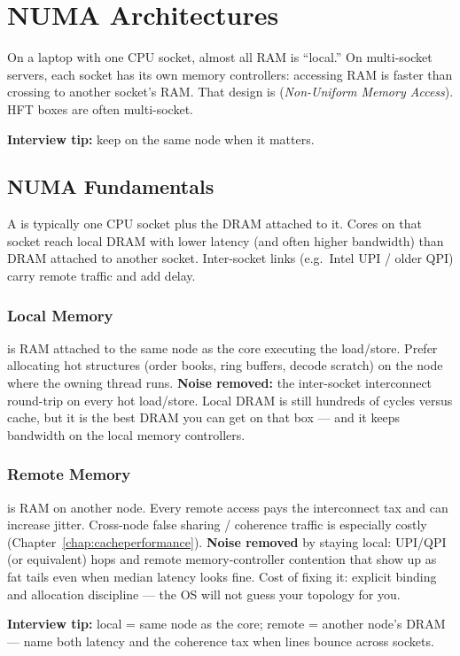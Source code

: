 \chapter{NUMA Architectures}
\label{chap:numa}

On a laptop with one CPU socket, almost all RAM is ``local.'' On multi-socket servers, 
each socket has its own memory controllers: accessing  RAM is faster than 
crossing to another socket's RAM. That design is  
(\emph{Non-Uniform Memory Access}). HFT boxes are often multi-socket.
\par\noindent\textbf{Interview tip:} keep  on the same node when it matters.

\section{NUMA Fundamentals}
\label{sec:numa-fundamentals}
A  is typically one CPU socket plus the DRAM attached to it. 
Cores on that socket reach local DRAM with lower latency (and often higher bandwidth) 
than DRAM attached to another socket. Inter-socket links (e.g.\ Intel UPI / older QPI) 
carry remote traffic and add delay.

\subsection{Local Memory}
\label{subsec:numa-local-memory}
 is RAM attached to the same node as the core executing the load/store. 
Prefer allocating hot structures (order books, ring buffers, decode scratch) on the node 
where the owning thread runs.
\newline
\textbf{Noise removed:} the inter-socket interconnect round-trip on every hot load/store. 
Local DRAM is still hundreds of cycles versus cache, but it is the best DRAM you can get 
on that box --- and it keeps bandwidth on the local memory controllers.

\subsection{Remote Memory}
\label{subsec:numa-remote-memory}
 is RAM on another node. Every remote access pays the interconnect 
tax and can increase jitter. Cross-node false sharing / coherence traffic is especially costly 
(Chapter~\ref{chap:cacheperformance}).
\newline
\textbf{Noise removed} by staying local: UPI/QPI (or equivalent) hops and remote memory-controller 
contention that show up as fat tails even when median latency looks fine. Cost of fixing it: 
explicit binding and allocation discipline --- the OS will not guess your topology for you.
\par\noindent\textbf{Interview tip:} local = same node as the core; remote = another node's DRAM --- 
name both latency and the coherence tax when lines bounce across sockets.

